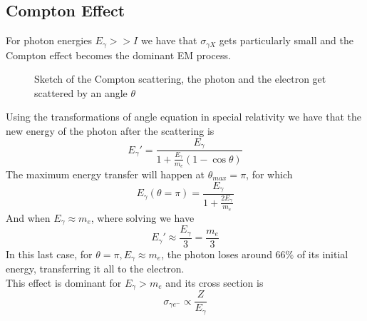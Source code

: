 \documentclass[../qm.tex]{subfiles}
\begin{document}
\subsection{Compton Effect}
For photon energies $E_\gamma>>I$ we have that $\sigma_{\gamma X}$ gets particularly small and the Compton effect becomes the dominant EM process.
\begin{figure}[H]
	\centering
	\caption{Sketch of the Compton scattering, the photon and the electron get scattered by an angle $\theta$}
	\label{fig:comptonscat}
\end{figure}
Using the transformations of angle equation in special relativity we have that the new energy of the photon after the scattering is
\begin{equation}
	E_\gamma'=\frac{E_\gamma}{1+\frac{E_\gamma}{m_e}\left( 1-\cos\theta \right)}
	\label{eq:comptonscaten}
\end{equation}
The maximum energy transfer will happen at $\theta_{max}=\pi$, for which
\begin{equation}
	E_\gamma(\theta=\pi)=\frac{E_\gamma}{1+\frac{2E_\gamma}{m_e}}
	\label{eq:maxanglecompton}
\end{equation}
And when $E_\gamma\approx m_e$, where solving we have
\begin{equation}
	E_\gamma'\approx\frac{E_\gamma}{3}=\frac{m_e}{3}
	\label{eq:maxcompton}
\end{equation}
In this last case, for $\theta=\pi,E_\gamma\approx m_e$, the photon loses around $66\%$ of its initial energy, transferring it all to the electron.\\
This effect is dominant for $E_\gamma>m_e$ and its cross section is
\begin{equation}
	\sigma_{\gamma e^-}\propto\frac{Z}{E_\gamma}
	\label{eq:comptoncs}
\end{equation}
\end{document}

